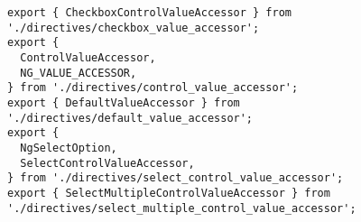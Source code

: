 \begin{verbatim}
export { CheckboxControlValueAccessor } from './directives/checkbox_value_accessor';
export {
  ControlValueAccessor,
  NG_VALUE_ACCESSOR,
} from './directives/control_value_accessor';
export { DefaultValueAccessor } from './directives/default_value_accessor';
export {
  NgSelectOption,
  SelectControlValueAccessor,
} from './directives/select_control_value_accessor';
export { SelectMultipleControlValueAccessor } from './directives/select_multiple_control_value_accessor';
\end{verbatim}
